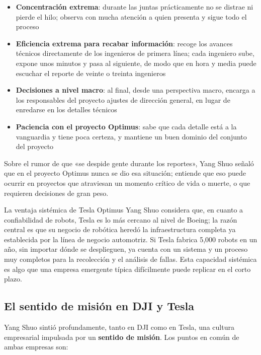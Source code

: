 \documentclass[a4paper]{article}
\begin{document}
\begin{itemize}
    \item \textbf{Concentración extrema}: durante las juntas prácticamente no se distrae ni pierde el hilo; observa con mucha atención a quien presenta y sigue todo el proceso
    \item \textbf{Eficiencia extrema para recabar información}: recoge los avances técnicos directamente de los ingenieros de primera línea; cada ingeniero sube, expone unos minutos y pasa al siguiente, de modo que en hora y media puede escuchar el reporte de veinte o treinta ingenieros
    \item \textbf{Decisiones a nivel macro}: al final, desde una perspectiva macro, encarga a los responsables del proyecto ajustes de dirección general, en lugar de enredarse en los detalles técnicos
    \item \textbf{Paciencia con el proyecto Optimus}: sabe que cada detalle está a la vanguardia y tiene poca certeza, y mantiene un buen dominio del conjunto del proyecto
\end{itemize}

Sobre el rumor de que «se despide gente durante los reportes», Yang Shuo señaló que en el proyecto Optimus nunca se dio esa situación; entiende que eso puede ocurrir en proyectos que atraviesan un momento crítico de vida o muerte, o que requieren decisiones de gran peso.

\begin{knowledgebox}{La ventaja sistémica de Tesla Optimus}
Yang Shuo considera que, en cuanto a confiabilidad de robots, Tesla es lo más cercano al nivel de Boeing; la razón central es que su negocio de robótica heredó la infraestructura completa ya establecida por la línea de negocio automotriz. Si Tesla fabrica 5,000 robots en un año, sin importar dónde se desplieguen, ya cuenta con un sistema y un proceso muy completos para la recolección y el análisis de fallas. Esta capacidad sistémica es algo que una empresa emergente típica difícilmente puede replicar en el corto plazo.
\end{knowledgebox}

\subsection{El sentido de misión en DJI y Tesla}

Yang Shuo sintió profundamente, tanto en DJI como en Tesla, una cultura empresarial impulsada por un \textbf{sentido de misión}. Los puntos en común de ambas empresas son:
\end{document}

